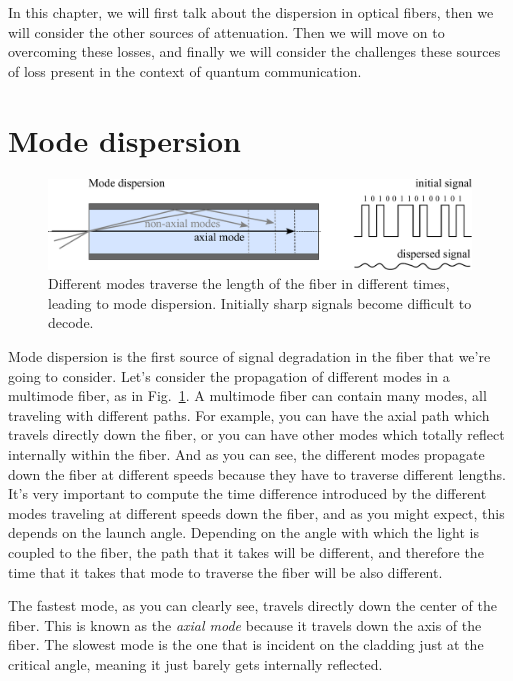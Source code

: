 In this chapter, we will first talk about the dispersion in optical fibers, then we will consider the other sources of attenuation. Then we will move on to overcoming these losses, and finally we will consider the challenges these sources of loss present in the context of quantum communication.


\section{Mode dispersion}
\label{sec:11-2_mode_dispersion}

\begin{figure}
    \centering
    \includegraphics[width=\textwidth]{lesson11/11-2_dispersion.pdf}
    \caption[Mode dispersion]{Different modes traverse the length of the fiber in different times, leading to mode dispersion. Initially sharp signals become difficult to decode.}
    \label{fig:11-2_mode_dispersion}
\end{figure}
Mode dispersion is the first source of signal degradation in the fiber that we're going to consider.
Let's consider the propagation of different modes in a multimode fiber, as in Fig.~\ref{fig:11-2_mode_dispersion}.
A multimode fiber can contain many modes, all traveling with different paths. For example, you can have the axial path which travels directly down the fiber, or you can have other modes which totally reflect internally within the fiber. And as you can see, the different modes propagate down the fiber at different speeds because they have to traverse different lengths. It's very important to compute the time difference introduced by the different modes traveling at different speeds down the fiber, and as you might expect, this depends on the launch angle. Depending on the angle with which the light is coupled to the fiber, the path that it takes will be different, and therefore the time that it takes that mode to traverse the fiber will be also different.

The fastest mode, as you can clearly see, travels directly down the center of the fiber. This is known as the \emph{axial mode} because it travels down the axis of the fiber. The slowest mode is the one that is incident on the cladding just at the critical angle, meaning it just barely gets internally reflected.

